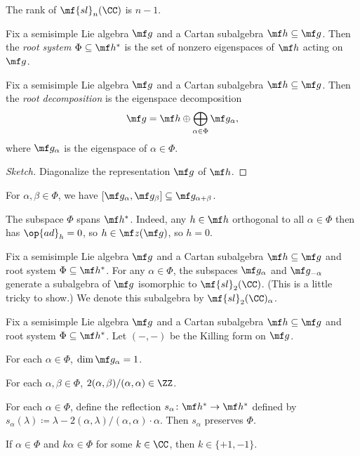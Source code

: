 \documentclass{article}
\begin{document}
\begin{example}
	The rank of $\mf{sl}_n(\CC)$ is $n-1$.
\end{example}
\begin{definition}
	Fix a semisimple Lie algebra $\mf g$ and a Cartan subalgebra $\mf h\subseteq\mf g$. Then the \textit{root system} $\Phi\subseteq\mf h^*$ is the set of nonzero eigenspaces of $\mf h$ acting on $\mf g$.
\end{definition}
\begin{proposition}
	Fix a semisimple Lie algebra $\mf g$ and a Cartan subalgebra $\mf h\subseteq\mf g$. Then the \textit{root decomposition} is the eigenspace decomposition
	\[\mf g=\mf h\oplus\bigoplus_{\alpha\in\Phi}\mf g_\alpha,\]
	where $\mf g_\alpha$ is the eigenspace of $\alpha\in\Phi$.
\end{proposition}
\begin{proof}[Sketch]
	Diagonalize the representation $\mf g$ of $\mf h$.
\end{proof}
\begin{remark}
	For $\alpha,\beta\in\Phi$, we have $[\mf g_\alpha,\mf g_\beta]\subseteq\mf g_{\alpha+\beta}$.
\end{remark}
\begin{remark}
	The subspace $\Phi$ spans $\mf h^*$. Indeed, any $h\in\mf h$ orthogonal to all $\alpha\in\Phi$ then has ${\op{ad}_h}=0$, so $h\in\mf z(\mf g)$, so $h=0$.
\end{remark}
\begin{notation}
	Fix a semisimple Lie algebra $\mf g$ and a Cartan subalgebra $\mf h\subseteq\mf g$ and root system $\Phi\subseteq\mf h^*$. For any $\alpha\in\Phi$, the subspaces $\mf g_\alpha$ and $\mf g_{-\alpha}$ generate a subalgebra of $\mf g$ isomorphic to $\mf{sl}_2(\CC)$. (This is a little tricky to show.) We denote this subalgebra by $\mf{sl}_2(\CC)_\alpha$.
\end{notation}
\begin{proposition}
	Fix a semisimple Lie algebra $\mf g$ and a Cartan subalgebra $\mf h\subseteq\mf g$ and root system $\Phi\subseteq\mf h^*$. Let $(-,-)$ be the Killing form on $\mf g$.
	\begin{listalph}
		\item For each $\alpha\in\Phi$, $\dim\mf g_\alpha=1$.
		\item For each $\alpha,\beta\in\Phi$, $2(\alpha,\beta)/(\alpha,\alpha)\in\ZZ$.
		\item For each $\alpha\in\Phi$, define the reflection $s_\alpha\colon\mf h^*\to\mf h^*$ defined by $s_\alpha(\lambda)\coloneqq\lambda-2(\alpha,\lambda)/(\alpha,\alpha)\cdot\alpha$. Then $s_\alpha$ preserves $\Phi$.
		\item If $\alpha\in\Phi$ and $k\alpha\in\Phi$ for some $k\in\CC$, then $k\in\{+1,-1\}$.
	\end{listalph}
\end{proposition}
\end{document}
